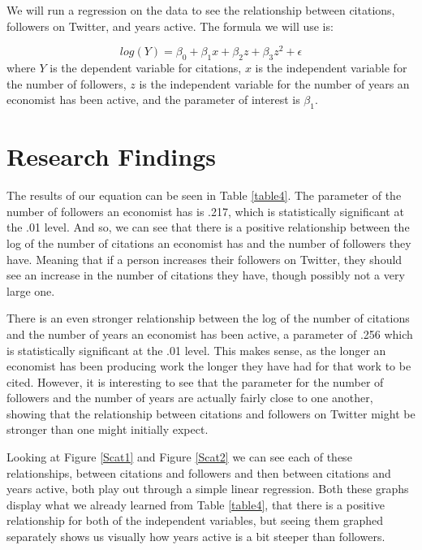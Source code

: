 \documentclass[12pt, Times New Roman]{article}
\begin{document}
We will run a regression on the data to see the relationship between citations, followers on Twitter, and years active. The formula we will use is:

\begin{equation}
log(Y) = \beta_0 + \beta_1x + \beta_2z + \beta_3z^2 + \epsilon
 \end{equation} 
where $Y$ is the dependent variable for citations, $x$ is the independent variable for the number of followers, $z$ is the independent variable for the number of years an economist has been active, and the parameter of interest is $\beta_1$.

\section*{Research Findings}\label{sec:results}

The results of our equation can be seen in Table \ref{table4}. The parameter of the number of followers an economist has is .217, which is statistically significant at the .01 level. And so, we can see that there is a positive relationship between the log of the number of citations an economist has and the number of followers they have. Meaning that if a person increases their followers on Twitter, they should see an increase in the number of citations they have, though possibly not a very large one. 

There is an even stronger relationship between the log of the number of citations and the number of years an economist has been active, a parameter of .256 which is statistically significant at the .01 level. This makes sense, as the longer an economist has been producing work the longer they have had for that work to be cited. However, it is interesting to see that the parameter for the number of followers and the number of years are actually fairly close to one another, showing that the relationship between citations and followers on Twitter might be stronger than one might initially expect. 

Looking at Figure \ref{Scat1} and Figure \ref{Scat2} we can see each of these relationships, between citations and followers and then between citations and years active, both play out through a simple linear regression. Both these graphs display what we already learned from Table \ref{table4}, that there is a positive relationship for both of the independent variables, but seeing them graphed separately shows us visually how years active is a bit steeper than followers.
\end{document}
